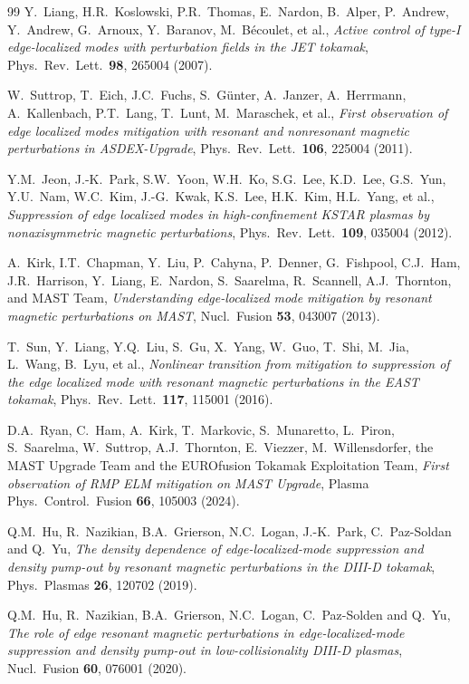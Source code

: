 \documentclass[12pt,prb,aps]{revtex4-1}
\begin{document}
\begin{thebibliography}{99}
 Y.~Liang, H.R.~Koslowski, P.R.~Thomas, E.~Nardon, B.~Alper, P.~Andrew, 
Y.~Andrew, G.~Arnoux, Y.~Baranov, M.~B\'{e}coulet, et al., {\em Active control of type-I edge-localized modes with perturbation fields in the JET  tokamak}, Phys.\ Rev.\ Lett.\ {\bf 98}, 265004 (2007).

 W.~Suttrop, T.~Eich, J.C.~Fuchs, S.~G\"{u}nter, A.~Janzer, A.~Herrmann, 
A.~Kallenbach, P.T.~Lang, T.~Lunt, M.~Maraschek,  et al., {\em First observation of edge localized modes mitigation with resonant and nonresonant magnetic perturbations in ASDEX-Upgrade}, Phys.\ Rev.\ Lett.\ {\bf 106}, 225004 (2011).

 Y.M.~Jeon, J.-K.~Park, S.W.~Yoon, W.H.~Ko, S.G.~Lee, K.D.~Lee, G.S.~Yun,
Y.U.~Nam, W.C.~Kim, J.-G.~Kwak, K.S.~Lee, H.K.~Kim, H.L.~Yang,  et al., {\em Suppression of edge localized modes in high-confinement KSTAR plasmas by nonaxisymmetric magnetic perturbations}, 
Phys.\ Rev.\ Lett.\ {\bf 109}, 035004 (2012).

 A.~Kirk, I.T.~Chapman, Y.~Liu, P.~Cahyna, P.~Denner, G.~Fishpool, C.J.~Ham,
J.R.~Harrison, Y.~Liang, E.~Nardon, S.~Saarelma, R.~Scannell, A.J.~Thornton,
and MAST Team, {\em Understanding edge-localized mode mitigation by resonant magnetic perturbations on MAST}, Nucl.\ Fusion {\bf 53}, 043007 (2013).

 T.~Sun, Y.~Liang, Y.Q.~Liu, S.~Gu, X.~Yang, W.~Guo, T.~Shi, M.~Jia, L.~Wang, 
B.~Lyu, et al., {\em Nonlinear transition from mitigation to suppression of the edge localized mode with resonant magnetic perturbations in the EAST tokamak}, Phys.\ Rev.\ Lett.\ {\bf 117}, 115001 (2016).

 D.A.~Ryan, C.~Ham, A.~Kirk, T.~Markovic, S.~Munaretto, L.~Piron, S.~Saarelma, W.~Suttrop, A.J.~Thornton, E.~Viezzer, M.~Willensdorfer, the MAST Upgrade Team and the EUROfusion Tokamak Exploitation Team, {\em First observation of RMP ELM mitigation on MAST Upgrade}, Plasma Phys.\ Control.\ Fusion {\bf 66},  105003 (2024).
 
  Q.M.~Hu, R.~Nazikian, B.A.~Grierson, N.C.~Logan, J.-K.~Park, C.~Paz-Soldan and Q.~Yu, {\em The density dependence
 of edge-localized-mode suppression and density pump-out by resonant magnetic perturbations in the DIII-D tokamak}, Phys.\ Plasmas  {\bf 26}, 120702 (2019).
 
  Q.M.~Hu, R.~Nazikian, B.A.~Grierson, N.C.~Logan, C.~Paz-Solden and Q.~Yu, {\em The role of edge resonant magnetic
 perturbations in edge-localized-mode suppression and density pump-out in low-collisionality DIII-D plasmas}, Nucl.\ Fusion {\bf 60}, 076001 (2020). 
 

\end{thebibliography}
\end{document}
